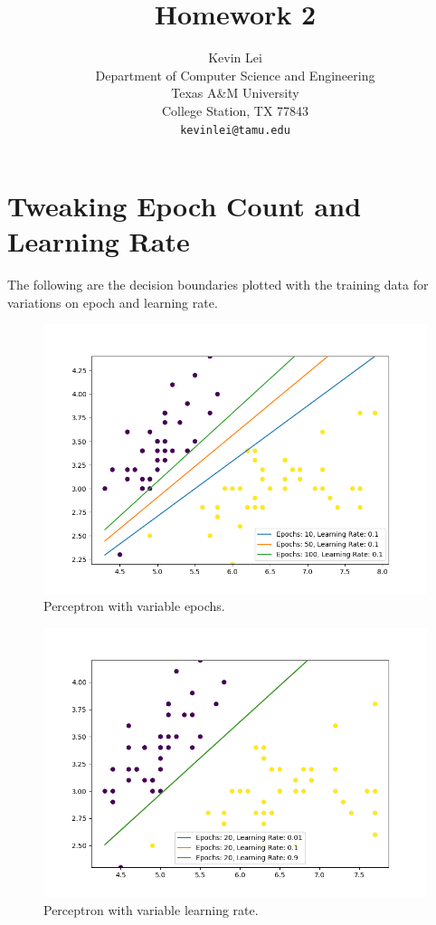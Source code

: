 \documentclass{article}
\title{Homework 2}
\author{
  Kevin Lei \\
  Department of Computer Science and Engineering \\
  Texas A\&M University \\
  College Station, TX 77843 \\
  \texttt{kevinlei@tamu.edu} \\
}
\begin{document}
\maketitle

\section{Tweaking Epoch Count and Learning Rate}

The following are the decision boundaries plotted with the training data for variations on epoch and learning rate.

\begin{minipage}{0.5\textwidth}
  \begin{figure}[H]
    \centering
    \includegraphics[width=\linewidth]{Figure_1.png}
    \caption{Perceptron with variable epochs.}
  \end{figure}
\end{minipage}
\begin{minipage}{0.5\textwidth}
  \begin{figure}[H]
    \centering
    \includegraphics[width=\linewidth]{Figure_2.png}
    \caption{Perceptron with variable learning rate.}
  \end{figure}
\end{minipage}
\end{document}
